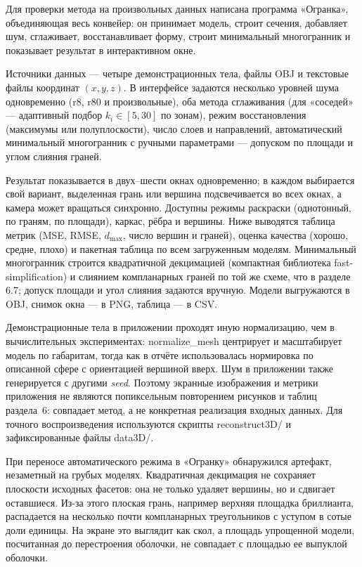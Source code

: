\documentclass[12pt, a4paper]{article}
\newcommand{\code}[1]{{\fontencoding{T1}\fontfamily{cmtt}\selectfont #1}}
\begin{document}
Для проверки метода на произвольных данных написана программа «Огранка», объединяющая весь конвейер: он принимает модель, строит сечения, добавляет шум, сглаживает, восстанавливает форму, строит минимальный многогранник и показывает результат в интерактивном окне.

Источники данных --- четыре демонстрационных тела, файлы OBJ и текстовые файлы координат $(x,y,z)$. В интерфейсе задаются несколько уровней шума одновременно (r8, r80 и произвольные), оба метода сглаживания (для «соседей» — адаптивный подбор $k_i\in[5,30]$ по зонам), режим восстановления (максимумы или полуплоскости), число слоев и направлений, автоматический минимальный многогранник с ручными параметрами --- допуском по площади и углом слияния граней.

Результат показывается в двух--шести окнах одновременно; в каждом выбирается свой вариант, выделенная грань или вершина подсвечивается во всех окнах, а камера может вращаться синхронно. Доступны режимы раскраски (однотонный, по граням, по площади), каркас, рёбра и вершины. Ниже выводятся таблица метрик (MSE, RMSE, $d_{\max}$, число вершин и граней), оценка качества (хорошо, средне, плохо) и пакетная таблица по всем загруженным моделям. Минимальный многогранник строится квадратичной декцимацией (компактная библиотека fast-simplification) и слиянием компланарных граней по той же схеме, что в разделе 6.7; допуск площади и угол слияния задаются вручную. Модели выгружаются в OBJ, снимок окна --- в PNG, таблица --- в CSV.

Демонстрационные тела в приложении проходят иную нормализацию, чем в вычислительных экспериментах: \code{normalize\_mesh} центрирует и масштабирует модель по габаритам, тогда как в отчёте использовалась нормировка по описанной сфере с ориентацией вершиной вверх. Шум в приложении также генерируется с другими \textit{seed}. Поэтому экранные изображения и метрики приложения не являются попиксельным повторением рисунков и таблиц раздела~6: совпадает метод, а не конкретная реализация входных данных. Для точного воспроизведения используются скрипты \code{reconstruct3D/} и зафиксированные файлы \code{data3D/}.

При переносе автоматического режима в «Огранку» обнаружился артефакт, незаметный на грубых моделях. Квадратичная декцимация не сохраняет плоскости исходных фасетов: она не только удаляет вершины, но и сдвигает оставшиеся. Из-за этого плоская грань, например верхняя площадка бриллианта, распадается на несколько почти компланарных треугольников с уступом в сотые доли единицы. На экране это выглядит как скол, а площадь упрощенной модели, посчитанная до перестроения оболочки, не совпадает с площадью ее выпуклой оболочки.
\end{document}
